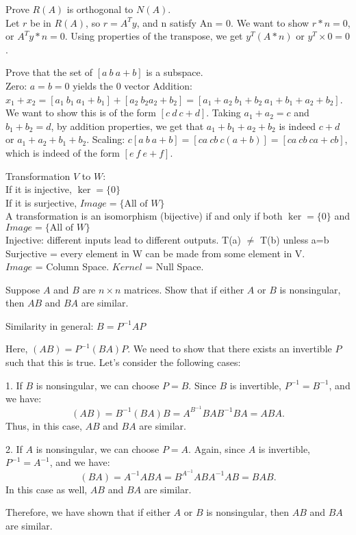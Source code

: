 \documentclass[12pt]{article}
\begin{document}
Prove $R(A)$ is orthogonal to $N(A)$.\\
Let $r$ be in $R(A)$, so $r = A^T y$, and n satisfy An = 0. We want to show $r*n = 0$, or $A^T y *n = 0$.
Using properties of the transpose, we get $y^T (A*n)$ or $y^T \times 0 = 0$.

Prove that the set of $[a ~b ~a+b]$ is a subspace.\\
Zero: $a=b=0$ yields the 0 vector
Addition: $x_1+x_2 = [a_1 ~b_1 ~a_1+b_1] + [a_2 ~b_2 a_2+b_2] = [a_1+a_2 ~b_1+b_2 ~a_1+b_1+a_2+b_2]$. We want to
show this is of the form $[c ~d ~c+d]$. Taking $a_1+a_2 = c$ and $b_1+b_2 = d$, by addition properties, we get that $a_1+b_1+a_2+b_2$ is indeed $c+d$ or $a_1+a_2+b_1+b_2$.
Scaling: $c[a ~b ~a+b] = [ca ~cb ~c(a+b)] = [ca ~cb ~ca+cb]$, which is indeed of the form $[e ~f ~e+f]$.


Transformation $V$ to $W$:\\
If it is injective, $\ker = \{0\}$\\
If it is surjective, $Image = \{\text{All of } W \}$\\
A transformation is an isomorphism (bijective) if and only if both $\ker = \{0\}$ and $Image = \{\text{All of } W\}$\\
Injective: different inputs lead to different outputs. T(a) $\neq$ T(b) unless a=b \\
Surjective = every element in W can be made from some element in V.\\
$Image$ = Column Space.    $Kernel$ = Null Space.


Suppose $A$ and $B$ are $n \times n$ matrices. Show that if either $A$ or $B$ is nonsingular, then $AB$ and $BA$ are similar.

Similarity in general: $B = P^{-1} A P$

Here, $(AB) = P^{-1} (BA) P$. We need to show that there exists an invertible $P$ such that this is true. Let's consider the following cases:

1. If $B$ is nonsingular, we can choose $P = B$. Since $B$ is invertible, $P^{-1} = B^{-1}$, and we have:
\[
(AB) = B^{-1} (BA) B = A^{B^{-1}} B A B^{-1} B A = ABA.
\]
Thus, in this case, $AB$ and $BA$ are similar.

2. If $A$ is nonsingular, we can choose $P = A$. Again, since $A$ is invertible, $P^{-1} = A^{-1}$, and we have:
\[
(BA) = A^{-1} AB A = B^{A^{-1}} A B A^{-1} A B = BAB.
\]
In this case as well, $AB$ and $BA$ are similar.

Therefore, we have shown that if either $A$ or $B$ is nonsingular, then $AB$ and $BA$ are similar.
\end{document}
